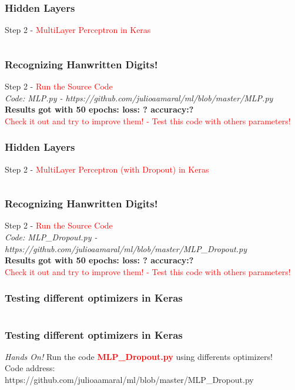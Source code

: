 \documentclass[aspectratio=169]{beamer}
\begin{document}
\begin{frame}
\frametitle{Hidden Layers}
Step 2 - \textcolor{red}{MultiLayer Perceptron in Keras}
\\[0.5cm]
\inputminted{python}{./aux_files/twenty.py}
\end{frame}

\begin{frame}
\frametitle{Recognizing Hanwritten Digits!}
Step 2 - \textcolor{red}{Run the Source Code}
\\[0.5cm]
\emph{Code: MLP.py - https://github.com/julioaamaral/ml/blob/master/MLP.py}
\\[0.3cm]
\textbf{Results got with 50 epochs: loss: ? accuracy:?}
\\[0.3cm]
\textcolor{red}{Check it out and try to improve them! - Test this code with others parameters!}
\end{frame}

\begin{frame}
\frametitle{Hidden Layers}
Step 2 - \textcolor{red}{MultiLayer Perceptron (with Dropout) in Keras}
\\[0.5cm]
\inputminted{python}{./aux_files/twentyone.py}
\end{frame}

\begin{frame}
\frametitle{Recognizing Hanwritten Digits!}
Step 2 - \textcolor{red}{Run the Source Code}
\\[0.5cm]
\emph{Code: MLP\_Dropout.py - https://github.com/julioaamaral/ml/blob/master/MLP\_Dropout.py}
\\[0.3cm]
\textbf{Results got with 50 epochs: loss: ? accuracy:?}
\\[0.3cm]
\textcolor{red}{Check it out and try to improve them! - Test this code with others parameters!}
\end{frame}



\begin{frame}
\frametitle{Testing different optimizers in Keras}
\inputminted{python}{./aux_files/twentytwo.py}
\end{frame}

\begin{frame}
\frametitle{Testing different optimizers in Keras}
\emph{Hands On!}
Run the code \textcolor{red}{\textbf{MLP\_Dropout.py}} using differents optimizers!
\\[0.3cm]
Code address: https://github.com/julioaamaral/ml/blob/master/MLP\_Dropout.py
\end{frame}
\end{document}
